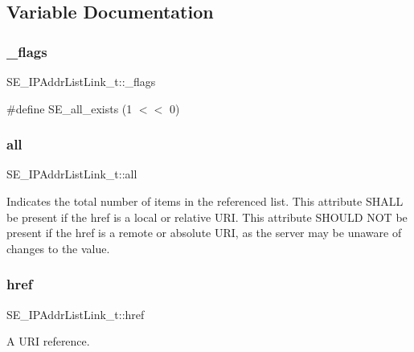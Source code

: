 \subsection{Variable Documentation}
\mbox{\label{group__IPAddrListLink_ga0fc4d06150ae2ccf7a69b0f01763262b}} 
\subsubsection{\texorpdfstring{\+\_\+flags}{\_flags}}
{\footnotesize\ttfamily S\+E\+\_\+\+I\+P\+Addr\+List\+Link\+\_\+t\+::\+\_\+flags}

\#define S\+E\+\_\+all\+\_\+exists (1 $<$$<$ 0) \mbox{\label{group__IPAddrListLink_gabfb9db992e8d73c518bf1220efa6bbae}} 
\subsubsection{\texorpdfstring{all}{all}}
{\footnotesize\ttfamily S\+E\+\_\+\+I\+P\+Addr\+List\+Link\+\_\+t\+::all}

Indicates the total number of items in the referenced list. This attribute S\+H\+A\+LL be present if the href is a local or relative U\+RI. This attribute S\+H\+O\+U\+LD N\+OT be present if the href is a remote or absolute U\+RI, as the server may be unaware of changes to the value. \mbox{\label{group__IPAddrListLink_gae02555e807312646921ccc931a552eef}} 
\subsubsection{\texorpdfstring{href}{href}}
{\footnotesize\ttfamily S\+E\+\_\+\+I\+P\+Addr\+List\+Link\+\_\+t\+::href}

A U\+RI reference. 